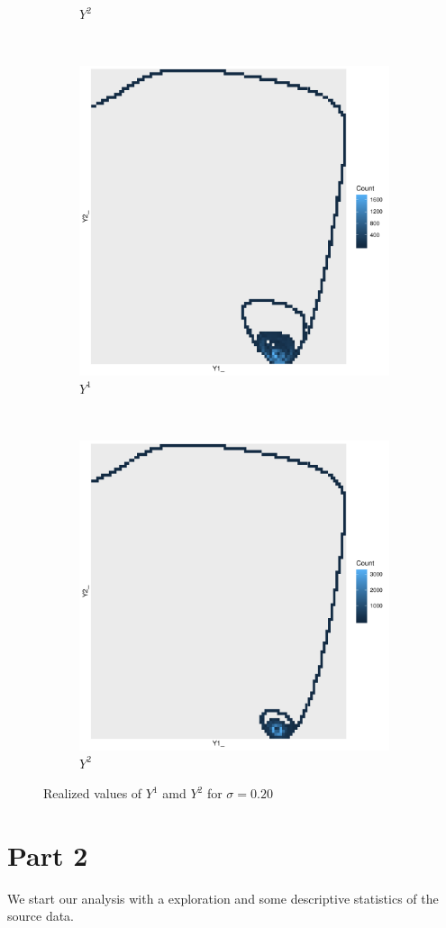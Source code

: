 \documentclass[a4paper]{article}
\begin{document}
\begin{figure}
\begin{subfigure}[b]{0.45\textwidth}
        \caption{$Y^2$}
    \end{subfigure}
    ~
    \begin{subfigure}[b]{0.45\textwidth}
        \includegraphics[width=\textwidth]{part1b-sigma3-grid.pdf}
        \caption{$Y^1$}
    \end{subfigure}
    ~
    \begin{subfigure}[b]{0.45\textwidth}
        \includegraphics[width=\textwidth]{part1b-sigma4-grid.pdf}
        \caption{$Y^2$}
    \end{subfigure}
    \caption{Realized values of $Y^1$ amd $Y^2$ for $\sigma = 0.20$}\label{fig:part1a-sigma2}
\end{figure}
\clearpage

\section{Part 2}

We start our analysis with a exploration and some descriptive statistics of the source data.
\end{document}
